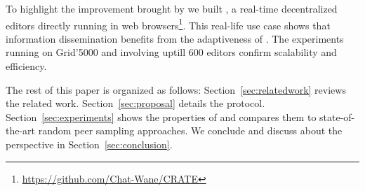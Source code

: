 To highlight the improvement brought by \SPRAY we built \CRATE, a real-time
decentralized editors directly running in web
browsers\footnote{\url{https://github.com/Chat-Wane/CRATE}}. This real-life use
case shows that information dissemination benefits from the adaptiveness of
\SPRAY. The experiments running on Grid'5000 and involving uptill 600 editors
confirm scalability and efficiency.

The rest of this paper is organized as follows: Section~\ref{sec:relatedwork}
reviews the related work. Section~\ref{sec:proposal}
details the \SPRAY protocol. Section~\ref{sec:experiments} shows the properties
of \SPRAY and compares them to state-of-the-art random peer sampling
approaches. We conclude and discuss about the perspective in
Section~\ref{sec:conclusion}.

